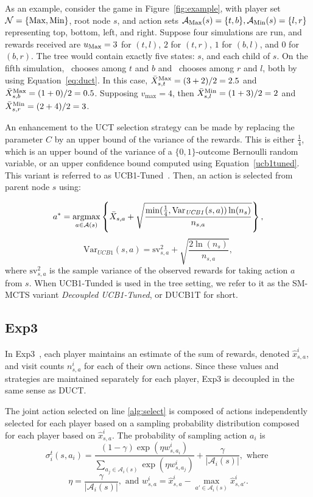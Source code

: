 \documentclass[conference]{IEEEtran}
\newcommand{\argmax}{\operatornamewithlimits{argmax}}
\newcommand{\cA}{\mathcal{A}}
\newcommand{\cN}{\mathcal{N}}
\begin{document}
As an example, consider the game in Figure~\ref{fig:example}, with player set $\cN = \{\Max,\Min\}$, root node $s$,
and action sets $\cA_{\Max}(s) = \{t,b\}, \cA_{\Min}(s) = \{l,r\}$ representing top, bottom, left, and right. 
Suppose four simulations are run, and rewards received are $u_{\text{Max}} = 3$ for $(t,l)$, $2$ for $(t,r)$, $1$ for $(b,l)$, 
and $0$ for $(b,r)$. The tree would contain exactly five states: $s$, and each child of $s$. On the fifth simulation, 
\Max~chooses among $t$ and $b$ and \Min~chooses among $r$ and $l$, both by using Equation~\ref{eq:duct}. 
In this case, $\bar{X}_{s,t}^{\text{Max}} = (3 + 2) / 2 = 2.5$ and $\bar{X}_{s,b}^{\text{Max}} = (1 + 0) / 2 = 0.5$. 
Supposing $v_{\max} = 4$, then $\bar{X}_{s,l}^{\text{Min}} = (1 + 3) / 2 = 2$ and $\bar{X}^{\text{Min}}_{s,r} = (2 + 4) / 2 = 3$. 

An enhancement to the UCT selection strategy can be made by replacing the parameter $C$ by an upper bound of the variance of 
the rewards. This is either $\frac{1}{4}$, which is an upper bound of the variance of a $\{0,1\}$-outcome Bernoulli
random variable, or an upper confidence bound computed using Equation~\ref{ucb1tuned}. 
This variant is referred to as UCB1-Tuned~\cite{Auer02Finite}. Then, an action is selected from parent 
node $s$ using:

\begin{equation}
\label{ucb1tuned}
a^* = \argmax_{a \in \cA(s)} \left\{ \bar{X}_{s,a} + \sqrt{\frac{\min(\frac{1}{4},\mathrm{Var}_{\mathit{UCB1}}(s,a)) \ln (n_{s})}{n_{s,a}}} \right\}, 
\end{equation}
\[
\mbox{Var}_{\mathit{UCB1}}(s,a)=\mbox{sv}^2_{s,a}+\sqrt{\frac{2 \ln (n_{s})}{n_{s,a}}},
\]
where $\mbox{sv}^2_{s,a}$ is the sample variance of the observed rewards for taking action $a$ from $s$. 
When UCB1-Tunded is used in the tree setting, we refer to it as the SM-MCTS variant {\it Decoupled UCB1-Tuned}, or DUCB1T for short.


\subsection{Exp3}

In Exp3~\cite{Exp3}, each player maintains an estimate of the sum of rewards, denoted $\hat{x}^i_{s,a}$, and visit 
counts $n^i_{s,a}$ for each of their own actions. 
Since these values and strategies are maintained separately for each player, 
Exp3 is decoupled in the same sense as DUCT. 

The joint action selected on line \ref{alg:select} is composed of actions independently selected for each player 
based on a sampling probability distribution composed for each player based on $\hat{x}^i_{s,a}$. 
The probability of sampling action $a_i$ is
\begin{equation}
\label{eq:exp3select}
\sigma^t_i(s,a_i) = \frac{(1-\gamma) \exp(\eta w^i_{s,a_i})}{\sum_{a_j \in \cA_i(s)} \exp(\eta w^i_{s,a_j})} + \frac{\gamma}{|\cA_i(s)|}, \mbox{ where }
\end{equation}
\[ \eta = \frac{\gamma}{|\cA_i(s)|}, \mbox{ and } w^i_{s,a} = \hat{x}^i_{s,a} - \max_{a' \in \cA_i(s)} \hat{x}^i_{s,a'}. \]
\end{document}
